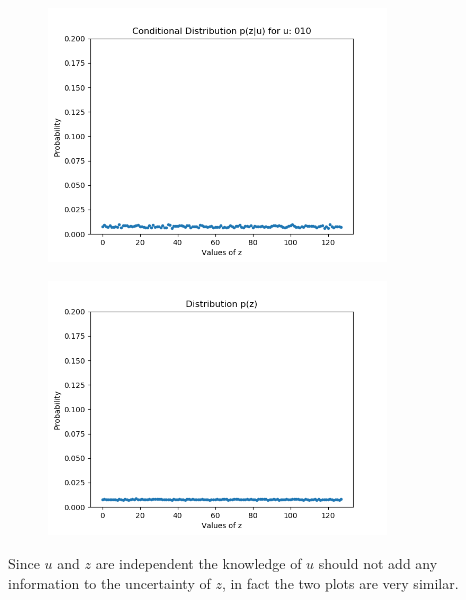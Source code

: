 \documentclass{report}
\begin{document}
\begin{figure}[H]
\centering
\includegraphics[width=0.8\textwidth]{plot6}
\end{figure}

\begin{figure}[H]
\centering
\includegraphics[width=0.8\textwidth]{plot7}
\end{figure}

Since $u$ and $z$ are independent the knowledge of $u$ should not add any information to the uncertainty of $z$, in fact the two plots are very similar.
\end{document}
